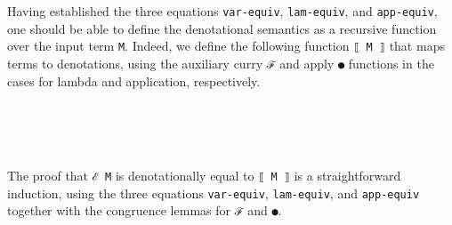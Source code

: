 Having established the three equations \texttt{var-equiv},
\texttt{lam-equiv}, and \texttt{app-equiv}, one should be able to define
the denotational semantics as a recursive function over the input term
\texttt{M}. Indeed, we define the following function \texttt{⟦\ M\ ⟧}
that maps terms to denotations, using the auxiliary curry \texttt{ℱ} and
apply \texttt{●} functions in the cases for lambda and application,
respectively.

\begin{fence}
\begin{code}%
\>[0]\AgdaSpace{}%
\AgdaSymbol{:}\AgdaSpace{}%
\AgdaSymbol{\}}\AgdaSpace{}%
\AgdaSpace{}%
\AgdaSymbol{(}\AgdaSpace{}%
\AgdaSymbol{:}\AgdaSpace{}%
\AgdaSpace{}%
\AgdaSpace{}%
\AgdaSymbol{)}\AgdaSpace{}%
\AgdaSpace{}%
\AgdaSpace{}%
\<%
\\
\>[0]\AgdaSpace{}%
\AgdaSpace{}%
\AgdaSpace{}%
\AgdaSpace{}%
\AgdaSpace{}%
\AgdaSpace{}%
\AgdaSymbol{=}\AgdaSpace{}%
\AgdaSpace{}%
\AgdaSpace{}%
\AgdaSpace{}%
\<%
\\
\>[0]\AgdaSpace{}%
\AgdaSpace{}%
\AgdaSpace{}%
\AgdaSpace{}%
\AgdaSymbol{=}\AgdaSpace{}%
\AgdaSpace{}%
\AgdaSpace{}%
\AgdaSpace{}%
\<%
\\
\>[0]\AgdaSpace{}%
\AgdaSpace{}%
\AgdaSpace{}%
\AgdaSpace{}%
\AgdaSpace{}%
\AgdaSymbol{=}\AgdaSpace{}%
\AgdaSpace{}%
\AgdaSpace{}%
\AgdaSpace{}%
\AgdaSpace{}%
\AgdaSpace{}%
\AgdaSpace{}%
\<%
\end{code}
\end{fence}

The proof that \texttt{ℰ\ M} is denotationally equal to \texttt{⟦\ M\ ⟧}
is a straightforward induction, using the three equations
\texttt{var-equiv}, \texttt{lam-equiv}, and \texttt{app-equiv} together
with the congruence lemmas for \texttt{ℱ} and \texttt{●}.

